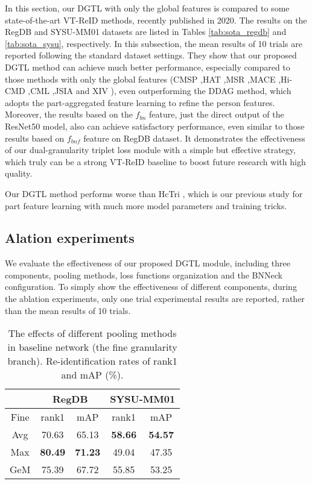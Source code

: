 \documentclass[journal]{IEEEtran}
\begin{document}
In this section, our DGTL with only the global features is compared to some state-of-the-art VT-ReID methods, recently published in 2020. The results on the RegDB and SYSU-MM01 datasets are listed in Tables \ref{tab:sota_regdb} and \ref{tab:sota_sysu}, respectively. In this subsection, the mean results of 10 trials are reported following the standard dataset settings.
They show that our proposed DGTL method can achieve much better performance, especially compared to those methods with only the global features (CMSP \cite{wu2020rgb},HAT \cite{ye2020vipr},MSR \cite{Feng2020LearningMR},MACE \cite{Ye2020CrossModalityPR},Hi-CMD \cite{choi2020hi},CML \cite{Ling2020ClassAwareMM},JSIA \cite{Wang2020CrossModalityPG} and XIV \cite{Li2020InfraredVisibleCP}), even outperforming the DDAG \cite{ye2020dynamic} method, which adopts the part-aggregated feature learning to refine the person features.
Moreover, the results based on the $f_{bn}$ feature, just the direct output of the ResNet50 model, also can achieve satisfactory performance, even similar to those results based on $f_{bnf}$ feature on RegDB dataset. It demonstrates the effectiveness of our dual-granularity triplet loss module with a simple but effective strategy, which truly can be a strong VT-ReID baseline to  boost future research with high quality.

Our DGTL method performs worse than HcTri \cite{Liu2020ParametersSE}, which is our previous study for part feature learning with much more model parameters and training tricks.

\subsection{Alation experiments}
We evaluate the effectiveness of our proposed DGTL module, including three components, pooling methods, loss functions organization and the BNNeck configuration. To simply show the effectiveness of different components, during the ablation experiments, only one trial experimental results are reported, rather than the mean results of 10 trials.


\begin{table}
\scriptsize
\caption{The effects of different pooling methods in baseline network (the fine granularity branch). Re-identification rates of rank1 and mAP (\%).}
\label{tab:ablation_fine_pool}
  \centering
  \setlength{\tabcolsep}{0.5cm}
  \begin{tabular}{c|c|c|c|c}
   \toprule[2pt]
     & \multicolumn{2}{c|}{RegDB} & \multicolumn{2}{c}{SYSU-MM01}\\ \hline
    Fine & rank1 & mAP  & rank1 & mAP  \\ \toprule[1pt]
    Avg & 70.63 & 65.13 & \textbf{58.66} & \textbf{54.57} \\
    Max & \textbf{80.49} & \textbf{71.23} & 49.04 & 47.35  \\
    GeM & 75.39 & 67.72 & 55.85 & 53.25  \\
     \toprule[2pt]
  \end{tabular}
\end{table}
\end{document}
